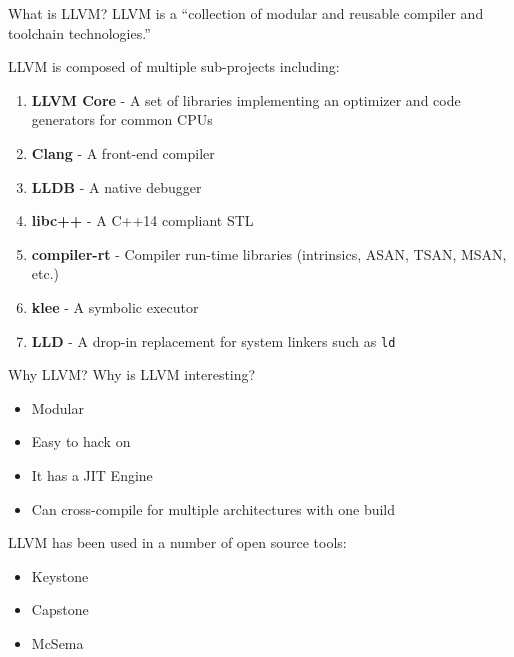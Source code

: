 \documentclass{beamer}
\begin{document}
\begin{frame}{What is LLVM?}
    LLVM is a ``collection of modular and reusable compiler and toolchain technologies.'' \cite{llvm_org}
    \vspace{1em}

    LLVM is composed of multiple sub-projects including:
    {\footnotesize
    \begin{enumerate}
        \item \textbf{LLVM Core} - A set of libraries implementing an optimizer and code generators for common CPUs
        \item \textbf{Clang} - A front-end compiler
        \item \textbf{LLDB} - A native debugger
        \item \textbf{libc++} - A C++14 compliant STL
        \item \textbf{compiler-rt} - Compiler run-time libraries (intrinsics, ASAN, TSAN, MSAN, etc.)
        \item \textbf{klee} - A symbolic executor
        \item \textbf{LLD} - A drop-in replacement for system linkers such as \texttt{ld}
    \end{enumerate}
    }
\end{frame}

\begin{frame}{Why LLVM?}
    Why is LLVM interesting?
    \begin{itemize}
        \item Modular
        \item Easy to hack on
        \item It has a JIT Engine
        \item Can cross-compile for multiple architectures with one build
    \end{itemize}

    \vspace{1cm}
    LLVM has been used in a number of open source tools:
    \begin{itemize}
        \item Keystone
        \item Capstone
        \item McSema
    \end{itemize}
\end{frame}
\end{document}
